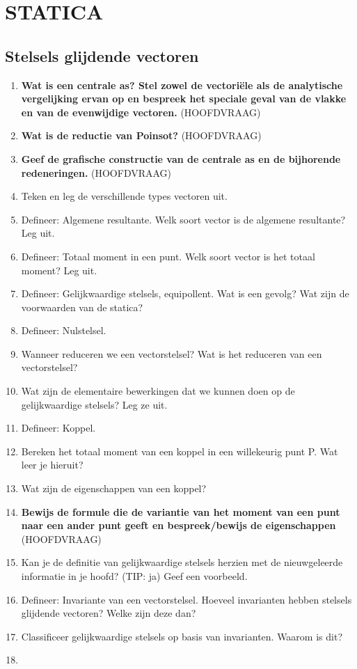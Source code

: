 \documentclass[12pt]{article}
\begin{document}
    \maketitle

    \section{STATICA}
    \subsection{Stelsels glijdende vectoren}
    \begin{enumerate}
        \item \textbf{Wat is een centrale as? Stel zowel de vectoriële als de analytische vergelijking ervan op en bespreek het speciale geval van de vlakke en van de evenwijdige vectoren.} (HOOFDVRAAG)
        \item \textbf{Wat is de reductie van Poinsot?} (HOOFDVRAAG)
        \item \textbf{Geef de grafische constructie van de centrale as en de bijhorende redeneringen.} (HOOFDVRAAG)
        \item Teken en leg de verschillende types vectoren uit.
        \item Defineer: Algemene resultante. Welk soort vector is de algemene resultante? Leg uit.
        \item Defineer: Totaal moment in een punt. Welk soort vector is het totaal moment? Leg uit.
        \item Defineer: Gelijkwaardige stelsels, equipollent. Wat is een gevolg? Wat zijn de voorwaarden van de statica?
        \item Defineer: Nulstelsel.
        \item Wanneer reduceren we een vectorstelsel? Wat is het reduceren van een vectorstelsel?
        \item Wat zijn de elementaire bewerkingen dat we kunnen doen op de gelijkwaardige stelsels? Leg ze uit.
        \item Defineer: Koppel.
        \item Bereken het totaal moment van een koppel in een willekeurig punt P. Wat leer je hieruit?
        \item Wat zijn de eigenschappen van een koppel?
        \item \textbf{Bewijs de formule die de variantie van het moment van een punt naar een ander punt geeft en bespreek/bewijs de eigenschappen} (HOOFDVRAAG)
        \item Kan je de definitie van gelijkwaardige stelsels herzien met de nieuwgeleerde informatie in je hoofd? (TIP: ja) Geef een voorbeeld.
        \item Defineer: Invariante van een vectorstelsel. Hoeveel invarianten hebben stelsels glijdende vectoren? Welke zijn deze dan?
        \item Classificeer gelijkwaardige stelsels op basis van invarianten. Waarom is dit?
        \item 
    \end{enumerate}
\end{document}
